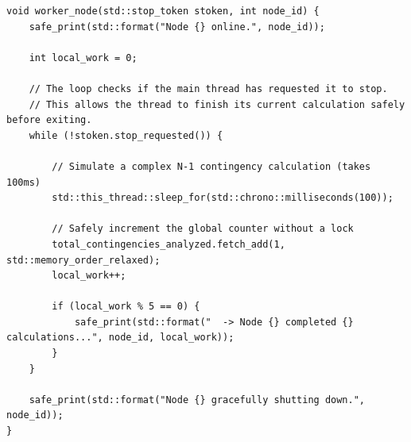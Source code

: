 \begin{verbatim}
void worker_node(std::stop_token stoken, int node_id) {
    safe_print(std::format("Node {} online.", node_id));
    
    int local_work = 0;
    
    // The loop checks if the main thread has requested it to stop.
    // This allows the thread to finish its current calculation safely before exiting.
    while (!stoken.stop_requested()) {
        
        // Simulate a complex N-1 contingency calculation (takes 100ms)
        std::this_thread::sleep_for(std::chrono::milliseconds(100));
        
        // Safely increment the global counter without a lock
        total_contingencies_analyzed.fetch_add(1, std::memory_order_relaxed);
        local_work++;
        
        if (local_work % 5 == 0) {
            safe_print(std::format("  -> Node {} completed {} calculations...", node_id, local_work));
        }
    }
    
    safe_print(std::format("Node {} gracefully shutting down.", node_id));
}
\end{verbatim}
